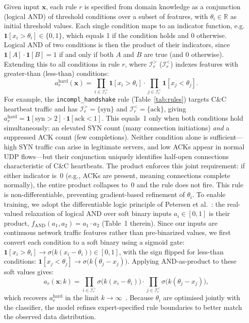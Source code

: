 \documentclass[journal]{IEEEtran}
\begin{document}
Given input $\mathbf{x}$, each rule $r$ is specified from domain knowledge
as a conjunction (logical AND) of threshold conditions over a subset of
features, with $\theta_i\in\mathbb{R}$ as initial threshold values.
Each single condition maps to an indicator function, e.g.\
$\mathbf{1}[x_i{>}\theta_i]\in\{0,1\}$, which equals 1 if the condition
holds and 0 otherwise. Logical AND of two conditions is then the product
of their indicators, since $\mathbf{1}[A]\cdot\mathbf{1}[B]=1$ if and only
if both $A$ and $B$ are true (and 0 otherwise). Extending this to all
conditions in rule $r$, where $\mathcal{I}_r^{>}$ ($\mathcal{I}_r^{<}$)
indexes features with greater-than (less-than) conditions:
\[
  a_r^{\mathrm{hard}}(\mathbf{x}) =
    \prod_{i\in\mathcal{I}_r^{>}}\!\mathbf{1}[x_i{>}\theta_i]\cdot
    \prod_{j\in\mathcal{I}_r^{<}}\!\mathbf{1}[x_j{<}\theta_j].
\]
For example, the \texttt{incompl\_handshake} rule (Table~\ref{tab:rules})
targets C\&C heartbeat traffic and has
$\mathcal{I}_r^{>}{=}\{\mathrm{syn}\}$ and
$\mathcal{I}_r^{<}{=}\{\mathrm{ack}\}$, giving
$a_r^{\mathrm{hard}}{=}\mathbf{1}[\mathrm{syn}{>}2]\cdot\mathbf{1}[\mathrm{ack}{<}1]$.
This equals~1 only when both conditions hold simultaneously: an elevated
SYN count (many connection initiations) \emph{and} a suppressed ACK count
(few completions). Neither condition alone is sufficient---high SYN traffic
can arise in legitimate servers, and low ACKs appear in normal UDP
flows---but their conjunction uniquely identifies half-open connections
characteristic of C\&C heartbeats. The product enforces this joint
requirement: if either indicator is~0 (e.g., ACKs are present, meaning
connections complete normally), the entire product collapses to~0 and the
rule does not fire.
This rule is non-differentiable, preventing gradient-based refinement of
$\theta_i$. To enable training, we adopt the differentiable logic principle
of Petersen et al.~\cite{petersen2022logic}: the real-valued relaxation of
logical AND over soft binary inputs $a_i\in[0,1]$ is their product,
$f_{\mathrm{AND}}(a_1,a_2)=a_1{\cdot}a_2$ (Table~1 therein). Since our
inputs are continuous network traffic features rather than pre-binarized
values, we first convert each condition to a soft binary using a sigmoid
gate: $\mathbf{1}[x_i{>}\theta_i]\to\sigma\!\bigl(k(x_i{-}\theta_i)\bigr)
\in[0,1]$, with the sign flipped for less-than conditions:
$\mathbf{1}[x_j{<}\theta_j]\to\sigma\!\bigl(k(\theta_j{-}x_j)\bigr)$.
Applying AND-as-product to these soft values gives:
\begin{equation}
  a_r(\mathbf{x};k) =
    \prod_{i\in\mathcal{I}_r^{>}}\!\sigma\!\bigl(k(x_i{-}\theta_i)\bigr)\cdot
    \prod_{j\in\mathcal{I}_r^{<}}\!\sigma\!\bigl(k(\theta_j{-}x_j)\bigr),
  \label{eq:rule_score}
\end{equation}
which recovers $a_r^{\mathrm{hard}}$ in the limit $k\to\infty$~\cite{yang2022ste}.
Because $\theta_i$ are optimised jointly with the classifier, the model
refines expert-specified rule boundaries to better match the observed
data distribution.
\end{document}
